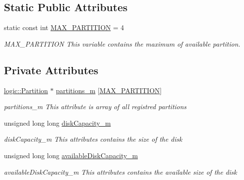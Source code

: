 \subsection*{Static Public Attributes}
\begin{DoxyCompactItemize}
\item 
\mbox{\label{classdisk_1_1_master_boot_record_aa48728b79a05271aa5ee366ad20b8d04}} 
static const int \mbox{\hyperlink{classdisk_1_1_master_boot_record_aa48728b79a05271aa5ee366ad20b8d04}{M\+A\+X\+\_\+\+P\+A\+R\+T\+I\+T\+I\+ON}} = 4
\begin{DoxyCompactList}\small\item\em M\+A\+X\+\_\+\+P\+A\+R\+T\+I\+T\+I\+ON This variable contains the maximum of available partition. \end{DoxyCompactList}\end{DoxyCompactItemize}
\subsection*{Private Attributes}
\begin{DoxyCompactItemize}
\item 
\mbox{\label{classdisk_1_1_master_boot_record_ac2d2a9b682f3b7edc61a521f4d80d23b}} 
\mbox{\hyperlink{classlogic_1_1_partition}{logic\+::\+Partition}} $\ast$ \mbox{\hyperlink{classdisk_1_1_master_boot_record_ac2d2a9b682f3b7edc61a521f4d80d23b}{partitions\+\_\+m}} \mbox{[}\mbox{\hyperlink{classdisk_1_1_master_boot_record_aa48728b79a05271aa5ee366ad20b8d04}{M\+A\+X\+\_\+\+P\+A\+R\+T\+I\+T\+I\+ON}}\mbox{]}
\begin{DoxyCompactList}\small\item\em partitions\+\_\+m This attribute is array of all registred partitions \end{DoxyCompactList}\item 
\mbox{\label{classdisk_1_1_master_boot_record_aa76dab35c2c0cab805f01b4ccda52a5f}} 
unsigned long long \mbox{\hyperlink{classdisk_1_1_master_boot_record_aa76dab35c2c0cab805f01b4ccda52a5f}{disk\+Capacity\+\_\+m}}
\begin{DoxyCompactList}\small\item\em disk\+Capacity\+\_\+m This attributes contains the size of the disk \end{DoxyCompactList}\item 
\mbox{\label{classdisk_1_1_master_boot_record_a29d1bfc38ff04219cc6f5f7a7a9bf276}} 
unsigned long long \mbox{\hyperlink{classdisk_1_1_master_boot_record_a29d1bfc38ff04219cc6f5f7a7a9bf276}{available\+Disk\+Capacity\+\_\+m}}
\begin{DoxyCompactList}\small\item\em available\+Disk\+Capacity\+\_\+m This attributes contains the available size of the disk \end{DoxyCompactList}\end{DoxyCompactItemize}
